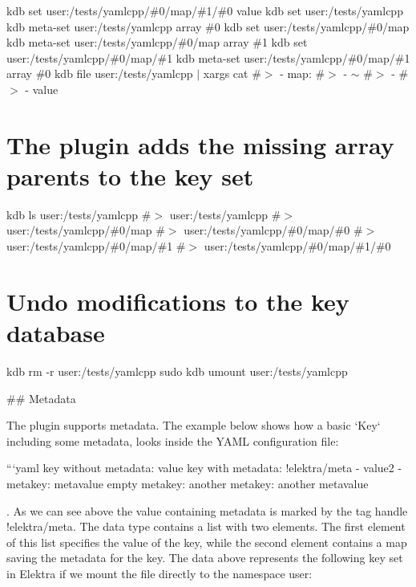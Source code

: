 kdb set user\+:/tests/yamlcpp/\#0/map/\#1/\#0 value kdb set user\+:/tests/yamlcpp kdb meta-\/set user\+:/tests/yamlcpp array \textquotesingle{}\#0\textquotesingle{} kdb set user\+:/tests/yamlcpp/\#0/map kdb meta-\/set user\+:/tests/yamlcpp/\#0/map array \textquotesingle{}\#1\textquotesingle{} kdb set user\+:/tests/yamlcpp/\#0/map/\#1 kdb meta-\/set user\+:/tests/yamlcpp/\#0/map/\#1 array \textquotesingle{}\#0\textquotesingle{} kdb file user\+:/tests/yamlcpp $\vert$ xargs cat \#$>$ -\/ map\+: \#$>$ -\/ $\sim$ \#$>$ -\/ \#$>$ -\/ value\hypertarget{autotoc_md807_autotoc_md849}{}\section{The plugin adds the missing array parents to the key set}\label{autotoc_md807_autotoc_md849}
kdb ls user\+:/tests/yamlcpp \#$>$ user\+:/tests/yamlcpp \#$>$ user\+:/tests/yamlcpp/\#0/map \#$>$ user\+:/tests/yamlcpp/\#0/map/\#0 \#$>$ user\+:/tests/yamlcpp/\#0/map/\#1 \#$>$ user\+:/tests/yamlcpp/\#0/map/\#1/\#0\hypertarget{autotoc_md807_autotoc_md850}{}\section{Undo modifications to the key database}\label{autotoc_md807_autotoc_md850}
kdb rm -\/r user\+:/tests/yamlcpp sudo kdb umount user\+:/tests/yamlcpp 
\begin{DoxyCode}
## Metadata

The plugin supports metadata. The example below shows how a basic `Key` including some metadata, looks
       inside the YAML configuration file:

```yaml
key without metadata: value
key with metadata: !elektra/meta
  - value2
  - metakey: metavalue
    empty metakey:
    another metakey: another metavalue
\end{DoxyCode}


. As we can see above the value containing metadata is marked by the tag handle {\ttfamily !elektra/meta}. The data type contains a list with two elements. The first element of this list specifies the value of the key, while the second element contains a map saving the metadata for the key. The data above represents the following key set in Elektra if we mount the file directly to the namespace {\ttfamily user}\+:

